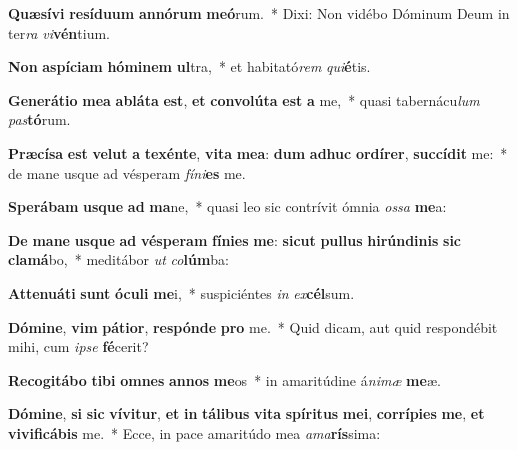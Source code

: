 \item \textbf{Quæ}\textbf{sí}\textbf{vi} \textbf{re}\textbf{sí}\textbf{du}\textbf{um} \textbf{an}\textbf{nó}\textbf{rum} \textbf{me}\textbf{ó}rum.~* Dixi: Non vidébo Dóminum Deum in ter\textit{ra} \textit{vi}\textbf{vén}tium.
\item \textbf{Non} \textbf{a}\textbf{spí}\textbf{ci}\textbf{am} \textbf{hó}\textbf{mi}\textbf{nem} \textbf{ul}tra,~* et habitató\textit{rem} \textit{qui}\textbf{é}tis.
\item \textbf{Ge}\textbf{ne}\textbf{rá}\textbf{ti}\textbf{o} \textbf{me}\textbf{a} \textbf{ab}\textbf{lá}\textbf{ta} \textbf{est}, \textbf{et} \textbf{con}\textbf{vo}\textbf{lú}\textbf{ta} \textbf{est} \textbf{a} me,~* quasi tabernácu\textit{lum} \textit{pas}\textbf{tó}rum.
\item \textbf{Præ}\textbf{cí}\textbf{sa} \textbf{est} \textbf{vel}\textbf{ut} \textbf{a} \textbf{te}\textbf{xén}\textbf{te}, \textbf{vi}\textbf{ta} \textbf{me}\textbf{a}: \textbf{dum} \textbf{ad}\textbf{huc} \textbf{or}\textbf{dí}\textbf{rer}, \textbf{suc}\textbf{cí}\textbf{dit} me:~* de mane usque ad vésperam \textit{fí}\textit{ni}\textbf{es} me.
\item \textbf{Spe}\textbf{rá}\textbf{bam} \textbf{us}\textbf{que} \textbf{ad} \textbf{ma}ne,~* quasi leo sic contrívit ómnia \textit{os}\textit{sa} \textbf{me}a:
\item \textbf{De} \textbf{ma}\textbf{ne} \textbf{us}\textbf{que} \textbf{ad} \textbf{vés}\textbf{pe}\textbf{ram} \textbf{fí}\textbf{ni}\textbf{es} \textbf{me}: \textbf{sic}\textbf{ut} \textbf{pul}\textbf{lus} \textbf{hi}\textbf{rún}\textbf{di}\textbf{nis} \textbf{sic} \textbf{cla}\textbf{má}bo,~* meditábor \textit{ut} \textit{co}\textbf{lúm}ba:
\item \textbf{At}\textbf{te}\textbf{nu}\textbf{á}\textbf{ti} \textbf{sunt} \textbf{ó}\textbf{cu}\textbf{li} \textbf{me}i,~* suspiciéntes \textit{in} \textit{ex}\textbf{cél}sum.
\item \textbf{Dó}\textbf{mi}\textbf{ne}, \textbf{vim} \textbf{pá}\textbf{ti}\textbf{or}, \textbf{re}\textbf{spón}\textbf{de} \textbf{pro} me.~* Quid dicam, aut quid respondébit mihi, cum \textit{ip}\textit{se} \textbf{fé}cerit?
\item \textbf{Re}\textbf{co}\textbf{gi}\textbf{tá}\textbf{bo} \textbf{ti}\textbf{bi} \textbf{om}\textbf{nes} \textbf{an}\textbf{nos} \textbf{me}os~* in amaritúdine á\textit{ni}\textit{mæ} \textbf{me}æ.
\item \textbf{Dó}\textbf{mi}\textbf{ne}, \textbf{si} \textbf{sic} \textbf{ví}\textbf{vi}\textbf{tur}, \textbf{et} \textbf{in} \textbf{tá}\textbf{li}\textbf{bus} \textbf{vi}\textbf{ta} \textbf{spí}\textbf{ri}\textbf{tus} \textbf{me}\textbf{i}, \textbf{cor}\textbf{rí}\textbf{pi}\textbf{es} \textbf{me}, \textbf{et} \textbf{vi}\textbf{vi}\textbf{fi}\textbf{cá}\textbf{bis} me.~* Ecce, in pace amaritúdo mea \textit{a}\textit{ma}\textbf{rís}sima:
